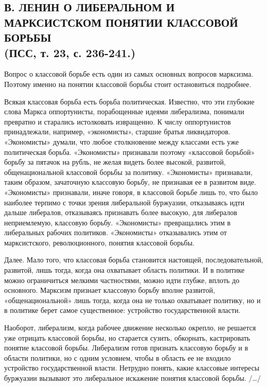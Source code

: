 \documentclass[12pt]{article}
\newcommand{\parnum}{(\arabic{parcount})}
\newcounter{parcount}
\newenvironment{parnumbers}{%
  \par%
  \everypar{\noindent \stepcounter{parcount}\marginpar[]{\parnum}}%
}{}
\begin{document}
\subsection{В. ЛЕНИН О ЛИБЕРАЛЬНОМ И МАРКСИСТСКОМ ПОНЯТИИ КЛАССОВОЙ БОРЬБЫ\\
    (ПСС, т. 23, с. 236-241.)}

  \begin{parnumbers}
    Вопрос о классовой борьбе есть один из самых основных вопросов марксизма. Поэтому именно на понятии классовой борьбы стоит остановиться подробнее.

    Всякая классовая борьба есть борьба политическая. Известно, что эти глубокие слова Маркса оппортунисты, порабощенные идеями либерализма, понимали превратно и старались истолковать извращенно. К числу оппортунистов принадлежали, например, «экономисты», старшие братья ликвидаторов. «Экономисты» думали, что любое столкновение между классами есть уже политическая борьба. «Экономисты» признавали поэтому «классовой борьбой» борьбу за пятачок на рубль, не желая видеть более высокой, развитой, общенациональной классовой борьбы за политику. «Экономисты» признавали, таким образом, зачаточную классовую борьбу, не признавая ее в развитом виде. «Экономисты» признавали, иначе говоря, в классовой борьбе лишь то, что было наиболее терпимо с точки зрения либеральной буржуазии, отказываясь идти дальше либералов, отказываясь признавать более высокую, для либералов неприемлемую, классовую борьбу. «Экономисты» превращались этим в либеральных рабочих политиков. «Экономисты» отказывались этим от марксистского, революционного, понятия классовой борьбы.

    Далее. Мало того, что классовая борьба становится настоящей, последовательной, развитой, лишь тогда, когда она охватывает область политики. И в политике можно ограничиться мелкими частностями, можно идти глубже, вплоть до основного. Марксизм признает классовую борьбу вполне развитой, «общенациональной» лишь тогда, когда она не только охватывает политику, но и в политике берет самое существенное: устройство государственной власти.

    Наоборот, либерализм, когда рабочее движение несколько окрепло, не решается уже отрицать классовой борьбы, но старается сузить, обкорнать, кастрировать понятие классовой борьбы. Либерализм готов признать классовую борьбу и в области политики, но с одним условием, чтобы в область ее не входило устройство государственной власти. Нетрудно понять, какие классовые интересы буржуазии вызывают это либеральное искажение понятия классовой борьбы. /…/


\end{parnumbers}
\end{document}
